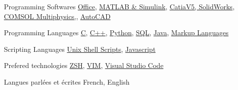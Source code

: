 

\begin{cvskills}

  \cvskill
    {Programming Softwares} %
    {\href{https://www.office.com/}{Office},
     \href{https://www.mathworks.com/}{MATLAB \& Simulink},
     \href{https://www.3ds.com/products-services/}{CatiaV5, SolidWorks},
     \href{https://www.comsol.com/}{COMSOL Multiphysics,},
     \href{https://www.autodesk.ca/en/products/autocad/overview}{AutoCAD}
    } %

  \cvskill
    {Programming Languages} %
    {\href{https://en.cppreference.com/w/c/languagehttps://en.cppreference.com/w/c/language}{C},
     \href{https://en.cppreference.com/w/cpp/language}{C++},
     \href{https://www.python.org/}{Python},
     \href{https://docs.oracle.com/en/database/other-databases/index.html}{SQL},
     \href{https://docs.oracle.com/en/java/index.html}{Java},
     \href{https://techterms.com/definition/markup_language}{Markup Languages}
    } %

  \cvskill
    {Scripting Languages} %
    {\href{https://www.gnu.org/software/bash/}{Unix Shell Scripts},
     \href{https://developer.oracle.com/ca-en/javascript/}{Javascript}
    }

  \cvskill
    {Prefered technologies} %
    {\href{http://zsh.sourceforge.net/}{ZSH},
     \href{https://www.vim.org/}{VIM},
     \href{https://code.visualstudio.com/}{Visual Studio Code}
    } %

  \cvskill
    {Langues parlées et écrites} %
    {French, English} %

\end{cvskills}
